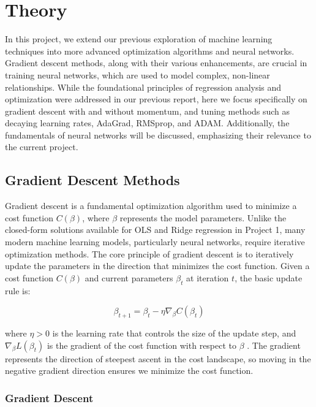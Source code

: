\documentclass[aps,pra,english,notitlepage,reprint,nofootinbib]{revtex4-1}  %
\begin{document}
\section{Theory}\label{sec:theory}

In this project, we extend our previous exploration of machine learning techniques into more advanced optimization algorithms and neural networks. Gradient descent methods, along with their various enhancements, are crucial in training neural networks, which are used to model complex, non-linear relationships. While the foundational principles of regression analysis and optimization were addressed in our previous report, here we focus specifically on gradient descent with and without momentum, and tuning methods such as decaying learning rates, AdaGrad, RMSprop, and ADAM. Additionally, the fundamentals of neural networks will be discussed, emphasizing their relevance to the current project.

\subsection{Gradient Descent Methods}

Gradient descent is a fundamental optimization algorithm used to minimize a cost function \( C(\beta) \), where \( \beta \) represents the model parameters. Unlike the closed-form solutions available for OLS and Ridge regression in Project 1, many modern machine learning models, particularly neural networks, require iterative optimization methods. The core principle of gradient descent is to iteratively update the parameters in the direction that minimizes the cost function. Given a cost function \( C(\beta) \) and current parameters \( \beta_t \) at iteration \(t\), the basic update rule is:

\begin{equation}
    \beta_{t+1} = \beta_t - \eta \nabla_\beta C(\beta_t)
\end{equation}

where \( \eta > 0 \) is the learning rate that controls the size of the update step, and \( \nabla_\beta L(\beta_t) \) is the gradient of the cost function with respect to \( \beta \) . The gradient represents the direction of steepest ascent in the cost landscape, so moving in the negative gradient direction ensures we minimize the cost function.

\subsubsection{Gradient Descent}
\end{document}
